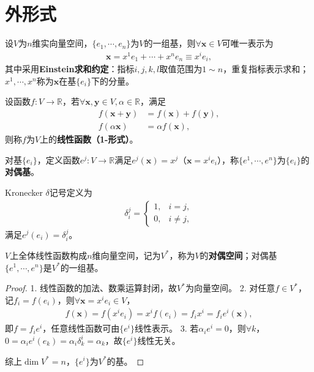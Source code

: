 \documentclass[../../main.tex]{subfiles}%
\begin{document}
\section{外形式}

\begin{definition}
设$V$为$n$维实向量空间，$\{e_1,\cdots,e_n\}$为$V$的一组基，则$\forall\boldsymbol{x}\in V$可唯一表示为
\begin{align*}
\boldsymbol{x}=x^1e_1+\cdots+x^ne_n\equiv x^ie_i,
\end{align*}
其中采用\textbf{Einstein求和约定}：指标$i,j,k,l$取值范围为$1\sim n$，重复指标表示求和；$x^1,\cdots,x^n$称为$\boldsymbol{x}$在基$\{e_i\}$下的分量。
\end{definition}

\begin{definition}
设函数$f:V\to\mathbb{R}$，若$\forall\boldsymbol{x},\boldsymbol{y}\in V,\alpha\in\mathbb{R}$，满足
\begin{align*}
f(\boldsymbol{x}+\boldsymbol{y})&=f(\boldsymbol{x})+f(\boldsymbol{y}),\\
f(\alpha\boldsymbol{x})&=\alpha f(\boldsymbol{x}),
\end{align*}
则称$f$为$V$上的\textbf{线性函数（1-形式）}。
\end{definition}

\begin{definition}
对基$\{e_i\}$，定义函数$e^j:V\to\mathbb{R}$满足$e^j(\boldsymbol{x})=x^j$（$\boldsymbol{x}=x^ie_i$），称$\{e^1,\cdots,e^n\}$为$\{e_i\}$的\textbf{对偶基}。
\end{definition}

\begin{definition}
Kronecker $\delta$记号定义为
\begin{align}
\delta_i^j=
\begin{cases}
1, & i=j,\\
0, & i\neq j,
\end{cases}
\label{eq:kronecker_delta}
\end{align}
满足$e^j(e_i)=\delta_i^j$。
\end{definition}

\begin{proposition}
$V$上全体线性函数构成$n$维向量空间，记为$V^*$，称为$V$的\textbf{对偶空间}；对偶基$\{e^1,\cdots,e^n\}$是$V^*$的一组基。
\end{proposition}
\begin{proof}
1. 线性函数的加法、数乘运算封闭，故$V^*$为向量空间。
2. 对任意$f\in V^*$，记$f_i=f(e_i)$，则$\forall\boldsymbol{x}=x^ie_i\in V$，
\begin{align*}
f(\boldsymbol{x})=f(x^ie_i)=x^if(e_i)=f_ix^i=f_ie^i(\boldsymbol{x}),
\end{align*}
即$f=f_ie^i$，任意线性函数可由$\{e^i\}$线性表示。
3. 若$\alpha_ie^i=0$，则$\forall k$，$0=\alpha_ie^i(e_k)=\alpha_i\delta_k^i=\alpha_k$，故$\{e^i\}$线性无关。

综上$\dim V^*=n$，$\{e^i\}$为$V^*$的基。
\end{proof}
\end{document}
